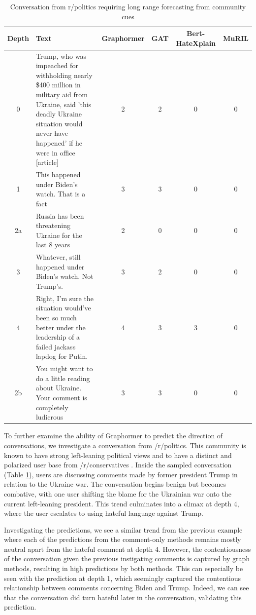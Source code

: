 \documentclass[letterpaper]{article} %
\begin{document}
\begin{table}
    \centering
        \caption{Conversation from r/politics requiring long range forecasting from community cues}
    \begin{tabular}{c|p{8cm}|c|c|c|c}
        Depth & Text & Graphormer & GAT & Bert-HateXplain & MuRIL \\
        \hline
        \hline
        0 & Trump, who was impeached for withholding nearly \$400 million in military aid from Ukraine, said 'this deadly Ukraine situation would never have happened' if he were in office [article] & 2 & 2 & 0 & 0 \\
        \hline
        1 & This happened under Biden's watch. That is a fact & 3 & 3 & 0 & 0  \\
        \hline
        2a & Russia has been threatening Ukraine for the last 8 years & 2 & 0 & 0 & 0 \\
        \hline
        3 & Whatever, still happened under Biden's watch. Not Trump's. & 3 & 2 & 0 & 0\\
        \hline
        4 & Right, I'm sure the situation would've been so much better under the leadership of a failed jackass lapdog for Putin. & 4 & 3 & 3 & 0\\
        \hline
        2b & You might want to do a little reading about Ukraine. Your comment is completely ludicrous & 3 & 3 & 0 & 0
    \end{tabular}
    \label{tab:predictive-trump}
\end{table}
To further examine the ability of Graphormer to predict the direction of conversations, we investigate a conversation from /r/politics. This community is known to have strong left-leaning political views and to have a distinct and polarized user base from /r/conservatives \cite{Waller2021}. Inside the sampled conversation (Table \ref{tab:predictive-trump}), users are discussing comments made by former president Trump in relation to the Ukraine war. The conversation begins benign but becomes combative,  %
with one user shifting the blame for the Ukrainian war onto the current left-leaning president. This trend culminates into a climax at depth 4, where the user escalates to using hateful language against Trump.

Investigating the predictions, we see a similar trend from the previous example where each of the predictions from the comment-only methods remains mostly neutral apart from the hateful comment at depth 4. However, the contentiousness of the conversation given the previous instigating comments is captured by graph methods, resulting in high predictions by both methods. This can especially be seen with the prediction at depth 1, which seemingly captured the contentious relationship between comments concerning Biden and Trump. Indeed, we can see that the conversation did turn hateful later in the conversation, validating this prediction.
\end{document}
